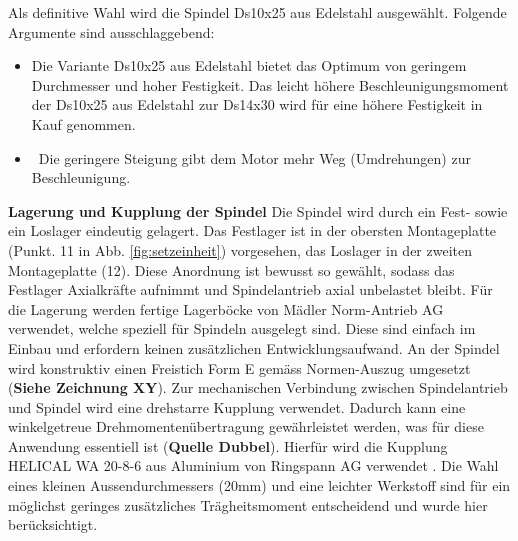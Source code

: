 Als definitive Wahl wird die Spindel Ds10x25 aus Edelstahl ausgewählt. Folgende Argumente sind ausschlaggebend:
	\begin{itemize}
	\item Die Variante Ds10x25 aus Edelstahl bietet das Optimum von geringem Durchmesser und hoher Festigkeit. Das leicht höhere Beschleunigungsmoment der Ds10x25 aus Edelstahl zur Ds14x30 wird für eine höhere Festigkeit in Kauf genommen.
	
	\item \ Die geringere Steigung gibt dem Motor mehr Weg (Umdrehungen) zur Beschleunigung.
\end{itemize}
\textbf{Lagerung und Kupplung der Spindel}
\newline
Die Spindel wird durch ein Fest- sowie ein Loslager eindeutig gelagert. Das Festlager ist in der obersten Montageplatte (Punkt. 11 in Abb. \ref{fig:setzeinheit}) vorgesehen, das Loslager in der zweiten Montageplatte (12). Diese Anordnung ist bewusst so gewählt, sodass das Festlager Axialkräfte aufnimmt und Spindelantrieb axial unbelastet bleibt. Für die Lagerung werden fertige Lagerböcke von Mädler Norm-Antrieb AG verwendet, welche speziell für Spindeln ausgelegt sind. Diese sind einfach im Einbau und erfordern keinen zusätzlichen Entwicklungsaufwand. An der Spindel wird konstruktiv einen Freistich Form E gemäss Normen-Auszug umgesetzt (\textbf{Siehe Zeichnung XY})\cite{vsm}.
\newline
Zur mechanischen Verbindung zwischen Spindelantrieb und Spindel wird eine drehstarre Kupplung verwendet. Dadurch kann eine winkelgetreue Drehmomentenübertragung gewährleistet werden, was für diese Anwendung essentiell ist (\textbf{Quelle Dubbel}). Hierfür wird die Kupplung HELICAL WA 20-8-6 aus Aluminium von Ringspann AG verwendet \cite{helical}. Die Wahl eines kleinen Aussendurchmessers (20mm) und eine leichter Werkstoff sind für ein möglichst geringes zusätzliches Trägheitsmoment entscheidend und wurde hier berücksichtigt.
